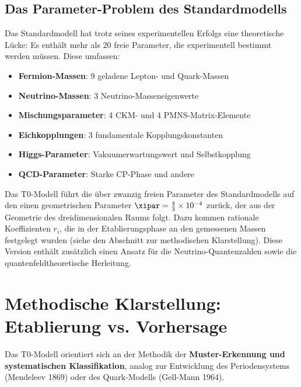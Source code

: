 	\subsection{Das Parameter-Problem des Standardmodells}
	\label{subsec:parameter_problem}
	
	Das Standardmodell hat trotz seines experimentellen Erfolgs eine theoretische Lücke: Es enthält mehr als 20 freie Parameter, die experimentell bestimmt werden müssen. Diese umfassen:
	
	\begin{itemize}
		\item \textbf{Fermion-Massen}: 9 geladene Lepton- und Quark-Massen
		\item \textbf{Neutrino-Massen}: 3 Neutrino-Masseneigenwerte
		\item \textbf{Mischungsparameter}: 4 CKM- und 4 PMNS-Matrix-Elemente
		\item \textbf{Eichkopplungen}: 3 fundamentale Kopplungskonstanten
		\item \textbf{Higgs-Parameter}: Vakuumerwartungswert und Selbstkopplung
		\item \textbf{QCD-Parameter}: Starke CP-Phase und andere
	\end{itemize}
	
	\begin{important}[Parameterreduktion]
		Das T0-Modell führt die über zwanzig freien Parameter des Standardmodells auf den einen geometrischen Parameter $\xipar = \frac{4}{3} \times 10^{-4}$ zurück, der aus der Geometrie des dreidimensionalen Raums folgt. Dazu kommen rationale Koeffizienten $r_i$, die in der Etablierungsphase an den gemessenen Massen festgelegt wurden (siehe den Abschnitt zur methodischen Klarstellung). Diese Version enthält zusätzlich einen Ansatz für die Neutrino-Quantenzahlen sowie die quantenfeldtheoretische Herleitung.
	\end{important}
	
	\section{Methodische Klarstellung: Etablierung vs. Vorhersage}
	\label{sec:methodische_klarstellung}
	
	\begin{important}
		Das T0-Modell orientiert sich an der Methodik der \textbf{Muster-Erkennung und systematischen Klassifikation}, analog zur Entwicklung des Periodensystems (Mendeleev 1869) oder des Quark-Modells (Gell-Mann 1964).
	\end{important}
	
